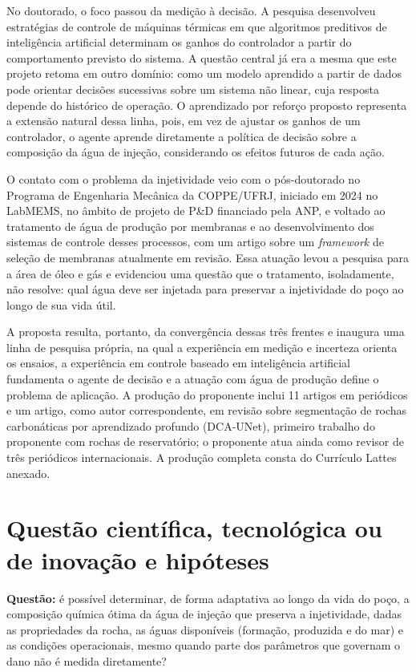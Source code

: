 \documentclass[10pt,a4paper]{article}
\newcommand{\itemedital}[1]{}
\begin{document}
No doutorado, o foco passou da medição à decisão. A pesquisa desenvolveu estratégias de
controle de máquinas térmicas em que algoritmos preditivos de inteligência artificial
determinam os ganhos do controlador a partir do comportamento previsto do sistema. A questão
central já era a mesma que este projeto retoma em outro domínio: como um modelo aprendido a
partir de dados pode orientar decisões sucessivas sobre um sistema não linear, cuja resposta
depende do histórico de operação. O aprendizado por reforço proposto representa a extensão
natural dessa linha, pois, em vez de ajustar os ganhos de um controlador, o agente aprende
diretamente a política de decisão sobre a composição da água de injeção, considerando os efeitos futuros de cada ação.

O contato com o problema da injetividade veio com o pós-doutorado no Programa de Engenharia
Mecânica da COPPE/UFRJ, iniciado em 2024 no LabMEMS, no âmbito de projeto de P\&D financiado
pela ANP, e voltado ao tratamento de água de produção por
membranas e ao desenvolvimento dos sistemas de controle desses processos, com um artigo sobre
um \textit{framework} de seleção de membranas atualmente em revisão. Essa atuação levou a
pesquisa para a área de óleo e gás e evidenciou uma questão que o tratamento, isoladamente,
não resolve: qual água deve ser injetada para preservar a injetividade do poço ao longo de sua
vida útil.

A proposta resulta, portanto, da convergência dessas três frentes e inaugura uma linha de
pesquisa própria, na qual a experiência em medição e incerteza orienta os ensaios, a
experiência em controle baseado em inteligência artificial fundamenta o agente de decisão e a
atuação com água de produção define o problema de aplicação.
A produção do proponente inclui 11 artigos em periódicos e um artigo, como autor
correspondente, em revisão sobre segmentação de rochas carbonáticas por aprendizado profundo
(DCA-UNet), primeiro trabalho do proponente com rochas de reservatório; o proponente atua
ainda como revisor de três periódicos internacionais. A produção completa consta do
Currículo Lattes anexado.

\section{Questão científica, tecnológica ou de inovação e hipóteses}\itemedital{2.16 X}

\textbf{Questão:} é possível determinar, de forma adaptativa ao longo da vida do poço, a
composição química ótima da água de injeção que preserva a injetividade, dadas as propriedades da rocha, as águas disponíveis (formação,
produzida e do mar) e as condições operacionais, mesmo quando parte dos parâmetros que
governam o dano não é medida diretamente?
\end{document}
